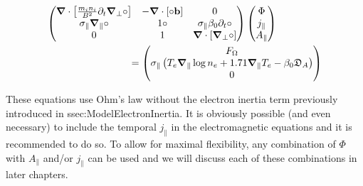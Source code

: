 \begin{align}
	\makebox[0.8\textwidth][l]{$\displaystyle
		\begin{pmatrix}
			\grad\cdot\left[\frac{m_i n_i}{ B^2}\partial_t\grad_\perp\circ\right] & 
			- \grad\cdot\left[\circ\mathbf{b}\right] & 
			0 \\
			\sigma_\parallel\grad_\parallel\circ &
			1 \circ &
			\sigma_\parallel\beta_0\partial_t\circ \\
			0 & 1 & \grad\cdot\left[\grad_\perp\circ\right]
		\end{pmatrix}
		\begin{pmatrix}
			\Phi \\ j_\parallel \\ A_\parallel
		\end{pmatrix}
		$} \nonumber \\	
	\makebox[0.8\textwidth][r]{$\displaystyle
		=\begin{pmatrix}
			F_\Omega \\
			\sigma_\parallel\left(T_e\grad_\parallel\log n_e + 1.71\grad_\parallel T_e - \beta_0\mathfrak{D}_A \right) \\
			0
		\end{pmatrix}
		$} \label{eq:S3X_vorticityEquation_Electromagnetism_matrix}
\end{align}



These equations use Ohm's law without the electron inertia term previously introduced in {ssec:ModelElectronInertia}. It is obviously possible (and even necessary) to include the temporal  $j_\parallel$ in the electromagnetic equations and it is recommended to do so. To allow for maximal flexibility, any combination of $\Phi$ with $A_\parallel$ and/or $j_\parallel$ can be used and we will discuss each of these combinations in later chapters.




